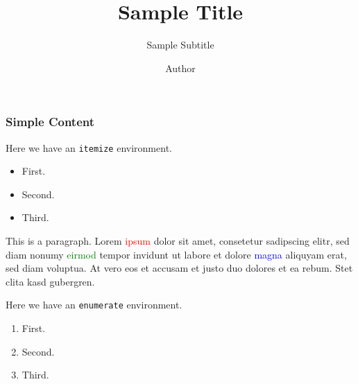 \title{Sample Title}
\subtitle{Sample Subtitle}
\author{Author}

\usebluestyle



	\setsecondayrtitlepage
	\begin{frame}
		\titlepage
	\end{frame}

	\setprimarytitlepage
	\begin{frame}
		\titlepage
	\end{frame}

	\begin{frame}
		\frametitle{Simple Content}
		Here we have an \texttt{itemize} environment.
		\begin{itemize}
			\item First.
			\item Second.
			\item Third.
		\end{itemize}
		\vspace{1em}

		This is a paragraph. Lorem \textcolor{red}{ipsum} dolor sit amet, consetetur sadipscing elitr, sed diam nonumy \textcolor{green}{eirmod} tempor invidunt ut labore et dolore \textcolor{blue}{magna} aliquyam erat, sed diam voluptua. At vero eos et accusam et justo duo dolores et ea rebum. Stet clita kasd gubergren.
		\vspace{1em}

		Here we have an \texttt{enumerate} environment.
		\begin{enumerate}
			\item First.
			\item Second.
			\item Third.
		\end{enumerate}
	\end{frame}

